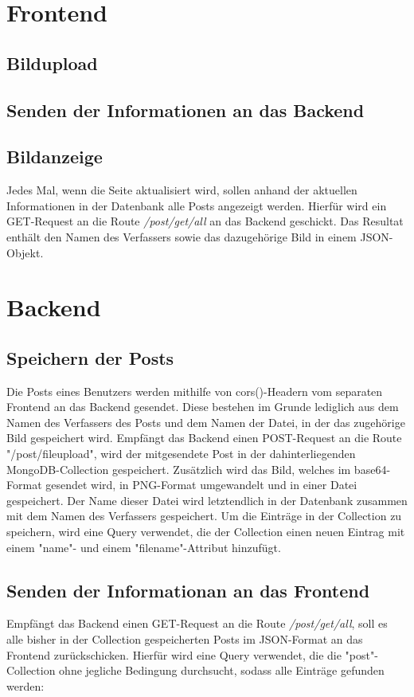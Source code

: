 \documentclass[12pt,a4paper]{report}
\begin{document}
\section{Frontend}




\subsection{Bildupload}

\subsection{Senden der Informationen an das Backend}

\subsection{Bildanzeige}
Jedes Mal, wenn die Seite aktualisiert wird, sollen anhand der aktuellen Informationen in der Datenbank alle Posts angezeigt werden. Hierfür wird ein GET-Request an die Route \textit{/post/get/all} an das Backend geschickt. Das Resultat enthält den Namen des Verfassers sowie das dazugehörige Bild in einem JSON-Objekt.

\section{Backend}

\subsection{Speichern der Posts}
Die Posts eines Benutzers werden mithilfe von cors()-Headern vom separaten Frontend an das Backend gesendet. Diese bestehen im Grunde lediglich aus dem Namen des Verfassers des Posts und dem Namen der Datei, in der das zugehörige Bild gespeichert wird. Empfängt das Backend einen POST-Request an die Route "/post/fileupload", wird der mitgesendete Post in der dahinterliegenden MongoDB-Collection gespeichert. Zusätzlich wird das Bild, welches im base64-Format gesendet wird, in PNG-Format umgewandelt und in einer Datei gespeichert. Der Name dieser Datei wird letztendlich in der Datenbank zusammen mit dem Namen des Verfassers gespeichert.
Um die Einträge in der Collection zu speichern, wird eine Query verwendet, die der Collection einen neuen Eintrag mit einem "name"- und einem "filename"-Attribut hinzufügt.

\subsection{Senden der Informationan an das Frontend}
Empfängt das Backend einen GET-Request an die Route \textit{/post/get/all}, soll es alle bisher in der Collection gespeicherten Posts im JSON-Format an das Frontend zurückschicken. Hierfür wird eine Query verwendet, die die "post"-Collection ohne jegliche Bedingung durchsucht, sodass alle Einträge gefunden werden:
\end{document}
